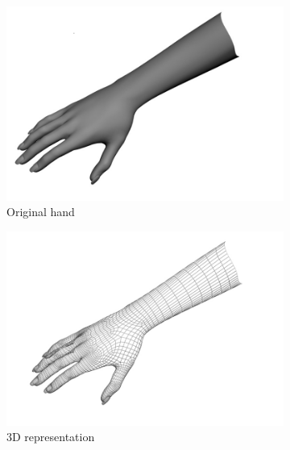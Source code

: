 \documentclass[12pt,a4paper,twoside]{report}
\begin{document}
\begin{figure}[h]
  \centering
    \begin{subfigure}{0.45\linewidth}
      \includegraphics[width=\linewidth]{img/Algorithms_hand_original.png}
      \caption{Original hand}  
    \end{subfigure}
    \begin{subfigure}{0.45\linewidth}
      \includegraphics[width=\linewidth]{img/Algorithms_hand_3d.png}
      \caption{3D representation}  
    \end{subfigure} \\
    \begin{subfigure}{0.45\linewidth}

\end{subfigure}
\end{figure}
\end{document}

